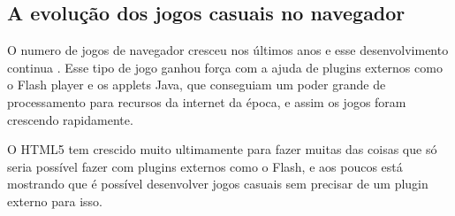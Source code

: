 \subsection{A evolução dos jogos casuais no navegador}

O numero de jogos de navegador cresceu nos últimos anos e esse
desenvolvimento continua \cite{ozcan2010recent}. Esse tipo de jogo
ganhou força com a ajuda de plugins externos como o Flash player e
os applets Java, que conseguiam um poder grande de processamento para
recursos da internet da época, e assim os jogos foram crescendo rapidamente.

O HTML5 tem crescido muito ultimamente para fazer muitas das coisas
que só seria possível fazer com plugins externos como o Flash, e aos
poucos está mostrando que é possível desenvolver jogos casuais sem
precisar de um plugin externo para isso.

